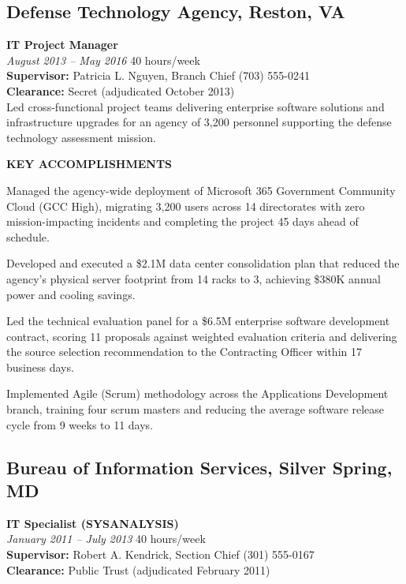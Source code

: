 \documentclass[11pt,letterpaper]{article}
\newcommand{\dutysection}[1]{%
  \par\vspace{6pt}\noindent\textbf{\footnotesize\color{Navy}\MakeUppercase{#1}}\par\vspace{2pt}%
}
\newcommand{\gradebadge}[1]{%
  \tcbox[colback=Gold!15,colframe=Gold!50,arc=3pt,boxrule=0.5pt,
         top=1pt,bottom=1pt,left=5pt,right=5pt,size=small,nobeforeafter]{%
    \footnotesize\color{Gold!90!black}\textbf{GS-#1}}%
}
\begin{document}
\subsection{Defense Technology Agency, Reston, VA}
\noindent\textbf{IT Project Manager} \hfill \gradebadge{12}\\[2pt]
\noindent\small\textit{August 2013 -- May 2016} \hfill \small 40 hours/week\\[2pt]
\noindent\small\textbf{Supervisor:} Patricia L. Nguyen, Branch Chief \hfill (703) 555-0241\\[2pt]
\noindent\small\textbf{Clearance:} Secret (adjudicated October 2013)\\[6pt]

Led cross-functional project teams delivering enterprise software solutions and infrastructure upgrades for an agency of 3,200 personnel supporting the defense technology assessment mission.

\dutysection{Key Accomplishments}
\begin{dutylist}
  \item Managed the agency-wide deployment of Microsoft 365 Government Community Cloud (GCC High), migrating 3,200 users across 14 directorates with zero mission-impacting incidents and completing the project 45 days ahead of schedule.
  \item Developed and executed a \$2.1M data center consolidation plan that reduced the agency's physical server footprint from 14 racks to 3, achieving \$380K annual power and cooling savings.
  \item Led the technical evaluation panel for a \$6.5M enterprise software development contract, scoring 11 proposals against weighted evaluation criteria and delivering the source selection recommendation to the Contracting Officer within 17 business days.
  \item Implemented Agile (Scrum) methodology across the Applications Development branch, training four scrum masters and reducing the average software release cycle from 9 weeks to 11 days.
\end{dutylist}

\subsection{Bureau of Information Services, Silver Spring, MD}
\noindent\textbf{IT Specialist (SYSANALYSIS)} \hfill \gradebadge{11}\\[2pt]
\noindent\small\textit{January 2011 -- July 2013} \hfill \small 40 hours/week\\[2pt]
\noindent\small\textbf{Supervisor:} Robert A. Kendrick, Section Chief \hfill (301) 555-0167\\[2pt]
\noindent\small\textbf{Clearance:} Public Trust (adjudicated February 2011)\\[6pt]
\end{document}
